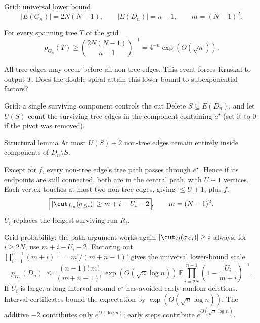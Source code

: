 \begin{frame}{Grid: universal lower bound}
 \[|E(G_n)|=2N(N-1),\qquad |E(D_n)|=n-1,\qquad m=(N-1)^2.\]
 \begin{block}{For every spanning tree \(T\) of the grid}
 \[p_{G_n}(T)\ge\binom{2N(N-1)}{n-1}^{-1}
 =4^{-n}\exp(O(\sqrt n)).\]
 \end{block}
  All tree edges may occur before all non-tree edges. This event forces Kruskal to output \(T\).
 \vspace{.25cm}
  Does the double spiral attain this lower bound to subexponential factors?
\end{frame}


\begin{frame}{Grid: a single surviving component controls the cut}
 Delete $S\subseteq E(D_n)$, and let $U(S)$ count the surviving tree edges in the component containing $e^\star$ (set it to $0$ if the pivot was removed).
 \begin{block}{Structural lemma}
 At most $U(S)+2$ non-tree edges remain entirely inside components of $D_n\setminus S$.
 \end{block}
  Except for $f$, every non-tree edge's tree path passes through $e^\star$. Hence if its endpoints are still connected, both are in the central path, with $U+1$ vertices. Each vertex touches at most two non-tree edges, giving $\le U+1$, plus $f$.
 \vspace{.17cm}
 \[\boxed{|\cut_{D_n}(\sigma_{\le i})|\ge m+i-U_i-2},\qquad m=(N-1)^2.\]
 \small{} $U_i$ replaces the longest surviving run $R_i$.
\end{frame}


\begin{frame}{Grid probability: the path argument works again}
  $|\cut_D(\sigma_{\le i})|\ge i$ always; for $i\ge2N$, use $m+i-U_i-2$.
 \vspace{.10cm}
  Factoring out $\prod_{i=1}^{n-1}(m+i)^{-1}=m!/(m+n-1)!$ gives the universal lower-bound scale
 \[p_{G_n}(D_n)\ \le\ \frac{(n-1)!\,m!}{(m+n-1)!}\,\exp(O(\sqrt n\log n))
 \ \mathbb E\prod_{i=2N}^{n-1}\left(1-\frac{U_i}{m+i}\right)^{-1}.\]
  If $U_i$ is large, a long interval around $e^\star$ has avoided early random deletions. Interval certificates bound the expectation by $\exp(O(\sqrt n\log n))$.
 \vspace{.12cm}
 \small The additive $-2$ contributes only $e^{O(\log n)}$; early steps contribute $e^{O(\sqrt n\log n)}$.
\end{frame}


